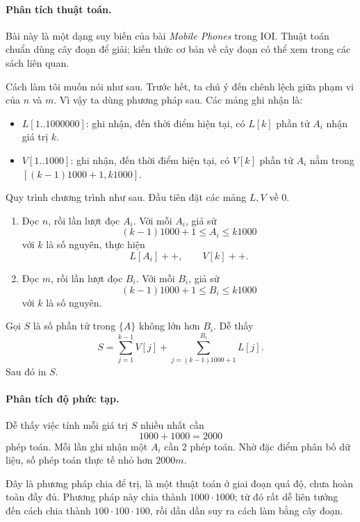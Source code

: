 \documentclass[11pt]{article}
\begin{document}
\paragraph{Phân tích thuật toán.}
Bài này là một dạng suy biến của bài \emph{Mobile Phones} trong IOI. Thuật
toán chuẩn dùng cây đoạn để giải; kiến thức cơ bản về cây đoạn có thể xem
trong các sách liên quan.

Cách làm tôi muốn nói như sau. Trước hết, ta chú ý đến chênh lệch giữa phạm
vi của \(n\) và \(m\). Vì vậy ta dùng phương pháp sau. Các mảng ghi nhận là:
\begin{itemize}
  \item \(L[1..1000000]\): ghi nhận, đến thời điểm hiện tại, có \(L[k]\) phần
        tử \(A_i\) nhận giá trị \(k\).
  \item \(V[1..1000]\): ghi nhận, đến thời điểm hiện tại, có \(V[k]\) phần tử
        \(A_i\) nằm trong \([(k-1)1000+1,k1000]\).
\end{itemize}

Quy trình chương trình như sau. Đầu tiên đặt các mảng \(L,V\) về 0.

\begin{enumerate}
  \item Đọc \(n\), rồi lần lượt đọc \(A_i\). Với mỗi \(A_i\), giả sử
        \[
          (k-1)1000+1 \le A_i \le k1000
        \]
        với \(k\) là số nguyên, thực hiện
        \[
          L[A_i]++,\qquad V[k]++.
        \]
  \item Đọc \(m\), rồi lần lượt đọc \(B_i\). Với mỗi \(B_i\), giả sử
        \[
          (k-1)1000+1 \le B_i \le k1000
        \]
        với \(k\) là số nguyên.
\end{enumerate}

Gọi \(S\) là số phần tử trong \(\{A\}\) không lớn hơn \(B_i\). Dễ thấy
\[
  S=\sum_{j=1}^{k-1} V[j]
    + \sum_{j=(k-1)1000+1}^{B_i} L[j].
\]
Sau đó in \(S\).

\paragraph{Phân tích độ phức tạp.}
Dễ thấy việc tính mỗi giá trị \(S\) nhiều nhất cần
\[
  1000+1000=2000
\]
phép toán. Mỗi lần ghi nhận một \(A_i\) cần 2 phép toán. Nhờ đặc điểm phân bố
dữ liệu, số phép toán thực tế nhỏ hơn \(2000m\).

Đây là phương pháp chia để trị, là một thuật toán ở giai đoạn quá độ, chưa
hoàn toàn đầy đủ. Phương pháp này chia thành \(1000\cdot1000\); từ đó rất dễ
liên tưởng đến cách chia thành \(100\cdot100\cdot100\), rồi dần dần suy ra
cách làm bằng cây đoạn.
\end{document}

